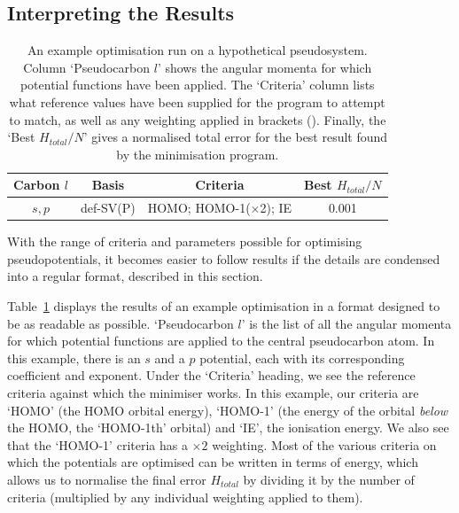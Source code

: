 \documentclass[aip,reprint,nofootinbib]{revtex4-1}
\begin{document}
\subsection{Interpreting the Results}

\begin{table}[h]
\begin{center}
\caption[An example pseudopotential optimisation table.]{An example optimisation run on a hypothetical pseudosystem. Column `Pseudocarbon $l$' shows the angular momenta for which potential functions have been applied. The `Criteria' column lists what reference values have been supplied for the program to attempt to match, as well as any weighting applied in brackets (). Finally, the `Best $H_{total}/N$' gives a normalised total error for the best result found by the minimisation program.}\label{tab:exampleopt}
\begin{tabular}{| c | c | c | c |}
\hline
\textbf{Carbon $l$} & 
\textbf{Basis} & 
\textbf{Criteria} & 
\textbf{Best $H_{total}/N$}\\
\hline
$s,p$ & def-SV(P) & \makecell{HOMO;\\ HOMO-1($\times$2);\\ IE} & 0.001 \\
\hline
\end{tabular}
\end{center}
\end{table}

With the range of criteria and parameters possible for optimising pseudopotentials, it becomes easier to follow results if the details are condensed into a regular format, described in this section.

Table~\ref{tab:exampleopt} displays the results of an example optimisation in a format designed to be as readable as possible. `Pseudocarbon $l$' is the list of all the angular momenta for which potential functions are applied to the central pseudocarbon atom. In this example, there is an $s$ and a $p$ potential, each with its corresponding coefficient and exponent. Under the `Criteria' heading, we see the reference criteria against which the minimiser works. In this example, our criteria are `HOMO' (the HOMO orbital energy), `HOMO-1' (the energy of the orbital \textit{below} the HOMO, the `HOMO-1th' orbital) and `IE', the ionisation energy. We also see that the `HOMO-1' criteria has a $\times2$ weighting. Most of the various criteria on which the potentials are optimised can be written in terms of energy, which allows us to normalise the final error $H_{total}$ by dividing it by the number of criteria (multiplied by any individual weighting applied to them).
\end{document}
